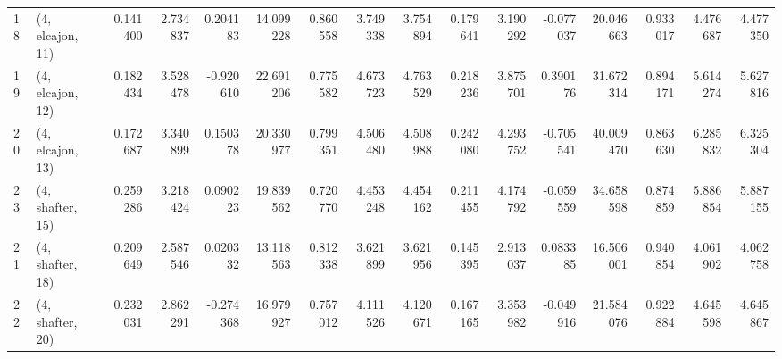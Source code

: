 \begin{tabular}{llrrrrrrrrrrrrrr}
18 &  (4, elcajon, 11) &   0.141400 &  2.734837 &  0.204183 &   14.099228 &  0.860558 &   3.749338 &   3.754894 &  0.179641 &  3.190292 & -0.077037 &   20.046663 &  0.933017 &   4.476687 &   4.477350 \\
19 &  (4, elcajon, 12) &   0.182434 &  3.528478 & -0.920610 &   22.691206 &  0.775582 &   4.673723 &   4.763529 &  0.218236 &  3.875701 &  0.390176 &   31.672314 &  0.894171 &   5.614274 &   5.627816 \\
20 &  (4, elcajon, 13) &   0.172687 &  3.340899 &  0.150378 &   20.330977 &  0.799351 &   4.506480 &   4.508988 &  0.242080 &  4.293752 & -0.705541 &   40.009470 &  0.863630 &   6.285832 &   6.325304 \\
23 &  (4, shafter, 15) &   0.259286 &  3.218424 &  0.090223 &   19.839562 &  0.720770 &   4.453248 &   4.454162 &  0.211455 &  4.174792 & -0.059559 &   34.658598 &  0.874859 &   5.886854 &   5.887155 \\
21 &  (4, shafter, 18) &   0.209649 &  2.587546 &  0.020332 &   13.118563 &  0.812338 &   3.621899 &   3.621956 &  0.145395 &  2.913037 &  0.083385 &   16.506001 &  0.940854 &   4.061902 &   4.062758 \\
22 &  (4, shafter, 20) &   0.232031 &  2.862291 & -0.274368 &   16.979927 &  0.757012 &   4.111526 &   4.120671 &  0.167165 &  3.353982 & -0.049916 &   21.584076 &  0.922884 &   4.645598 &   4.645867 \\
\bottomrule
\end{tabular}
